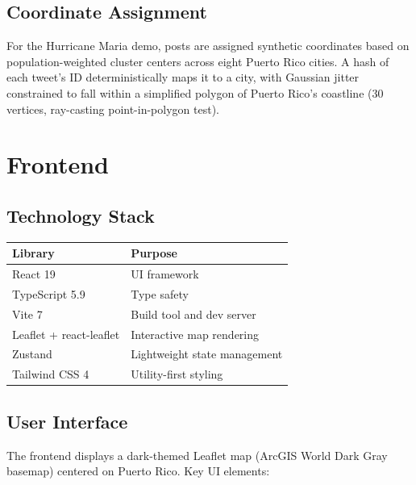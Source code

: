 \documentclass[11pt,a4paper]{article}
\begin{document}
\subsection{Coordinate Assignment}

For the Hurricane Maria demo, posts are assigned synthetic coordinates based on population-weighted cluster centers across eight Puerto Rico cities. A hash of each tweet's ID deterministically maps it to a city, with Gaussian jitter constrained to fall within a simplified polygon of Puerto Rico's coastline (30 vertices, ray-casting point-in-polygon test).

\newpage
\section{Frontend}

\subsection{Technology Stack}

\begin{table}[H]
\centering
\begin{tabular}{ll}
\toprule
\textbf{Library} & \textbf{Purpose} \\
\midrule
React 19 & UI framework \\
TypeScript 5.9 & Type safety \\
Vite 7 & Build tool and dev server \\
Leaflet + react-leaflet & Interactive map rendering \\
Zustand & Lightweight state management \\
Tailwind CSS 4 & Utility-first styling \\
\bottomrule
\end{tabular}
\end{table}

\subsection{User Interface}

The frontend displays a dark-themed Leaflet map (ArcGIS World Dark Gray basemap) centered on Puerto Rico. Key UI elements:
\end{document}
